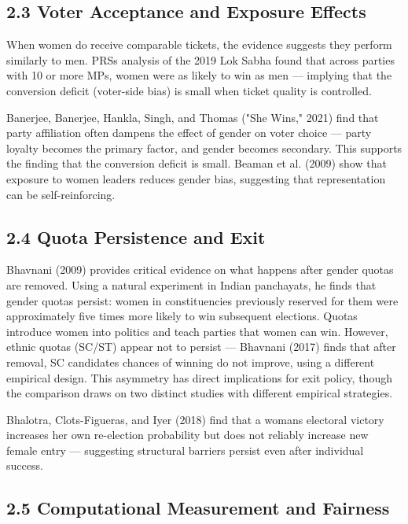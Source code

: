 \documentclass[
]{article}
\begin{document}
\subsection{2.3 Voter Acceptance and Exposure Effects}\label{23-voter-acceptance-and-exposure-effects}

When women do receive comparable tickets, the evidence suggests they perform similarly to men. PRS\textquotesingle s analysis of the 2019 Lok Sabha found that across parties with 10 or more MPs, women were as likely to win as men --- implying that the conversion deficit (voter-side bias) is small when ticket quality is controlled.

Banerjee, Banerjee, Hankla, Singh, and Thomas ("She Wins," 2021) find that party affiliation often dampens the effect of gender on voter choice --- party loyalty becomes the primary factor, and gender becomes secondary. This supports the finding that the conversion deficit is small. Beaman et al. (2009) show that exposure to women leaders reduces gender bias, suggesting that representation can be self-reinforcing.

\subsection{2.4 Quota Persistence and Exit}\label{24-quota-persistence-and-exit}

Bhavnani (2009) provides critical evidence on what happens after gender quotas are removed. Using a natural experiment in Indian panchayats, he finds that gender quotas persist: women in constituencies previously reserved for them were approximately five times more likely to win subsequent elections. Quotas introduce women into politics and teach parties that women can win. However, ethnic quotas (SC/ST) appear not to persist --- Bhavnani (2017) finds that after removal, SC candidates\textquotesingle{} chances of winning do not improve, using a different empirical design. This asymmetry has direct implications for exit policy, though the comparison draws on two distinct studies with different empirical strategies.

Bhalotra, Clots-Figueras, and Iyer (2018) find that a woman\textquotesingle s electoral victory increases her own re-election probability but does not reliably increase new female entry --- suggesting structural barriers persist even after individual success.

\subsection{2.5 Computational Measurement and Fairness}\label{25-computational-measurement-and-fairness}
\end{document}
